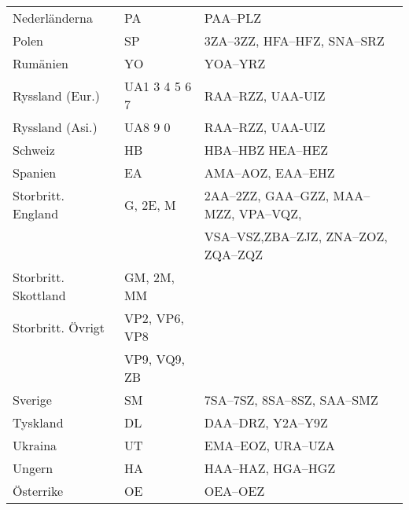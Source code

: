 \begin{center}
\begin{footnotesize}
\begin{longtable}{lll}
			Nederländerna                 & PA             & PAA--PLZ                                          \\
			Polen                         & SP             & 3ZA--3ZZ, HFA--HFZ, SNA--SRZ                      \\
			Rumänien                      & YO             & YOA--YRZ                                          \\
			Ryssland (Eur.)               & UA1 3 4 5 6 7  & RAA--RZZ, UAA-UIZ                                 \\
			Ryssland (Asi.)               & UA8 9 0        & RAA--RZZ, UAA-UIZ                                 \\
			Schweiz                       & HB             & HBA--HBZ HEA--HEZ                                 \\
			Spanien                       & EA             & AMA--AOZ, EAA--EHZ                                \\
			Storbritt. England            & G, 2E, M       & 2AA--2ZZ, GAA--GZZ, MAA--MZZ, VPA--VQZ,           \\
			                              &                & VSA--VSZ,ZBA--ZJZ, ZNA--ZOZ, ZQA--ZQZ             \\
			Storbritt. Skottland          & GM, 2M, MM     &                                                   \\
			Storbritt. Övrigt             & VP2, VP6, VP8  &                                                   \\
			                              & VP9, VQ9, ZB   &                                                   \\
			Sverige                       & SM             & 7SA--7SZ, 8SA--8SZ, SAA--SMZ                      \\
			Tyskland                      & DL             & DAA--DRZ, Y2A--Y9Z                                \\
			Ukraina                       & UT             & EMA--EOZ, URA--UZA                                \\
			Ungern                        & HA             & HAA--HAZ, HGA--HGZ                                \\
			Österrike                     & OE             & OEA--OEZ\\
		\end{longtable}
	\end{footnotesize}
\end{center}

